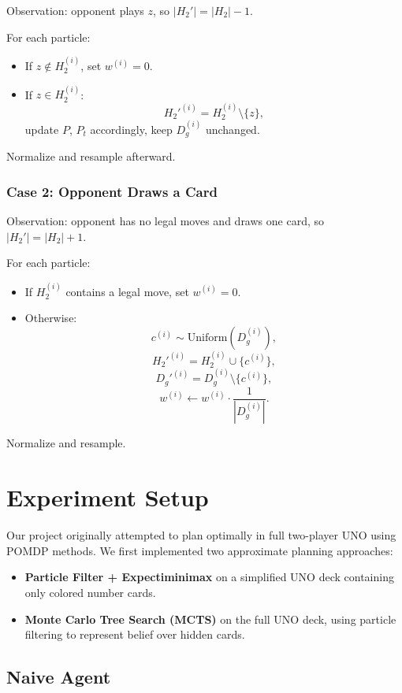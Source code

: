 \documentclass[journal,transmag]{IEEEtran}
\begin{document}
Observation: opponent plays $z$, so $|H_2'| = |H_2| - 1$.

For each particle:
\begin{itemize}
    \item If $z \notin H_2^{(i)}$, set $w^{(i)} = 0$.
    \item If $z \in H_2^{(i)}$:
    \[
    H_2'^{(i)} = H_2^{(i)} \setminus \{z\},
    \]
    update $P$, $P_t$ accordingly, keep $D_g^{(i)}$ unchanged.
\end{itemize}

Normalize and resample afterward.

\subsubsection{Case 2: Opponent Draws a Card}

Observation: opponent has no legal moves and draws one card, so  
$|H_2'| = |H_2| + 1$.

For each particle:
\begin{itemize}
    \item If $H_2^{(i)}$ contains a legal move, set $w^{(i)} = 0$.
    \item Otherwise:
    \[
    c^{(i)} \sim \text{Uniform}(D_g^{(i)}),
    \]
    \[
    H_2'^{(i)} = H_2^{(i)} \cup \{c^{(i)}\},
    \]
    \[
    D_g'^{(i)} = D_g^{(i)} \setminus \{c^{(i)}\},
    \]
    \[
    w^{(i)} \leftarrow w^{(i)} \cdot \frac{1}{|D_g^{(i)}|}.
    \]
\end{itemize}

Normalize and resample.

\section{Experiment Setup}

Our project originally attempted to plan optimally in full two-player
UNO using POMDP methods. We first implemented two approximate planning
approaches:

\begin{itemize}
    \item \textbf{Particle Filter + Expectiminimax} on a simplified UNO
          deck containing only colored number cards.
    \item \textbf{Monte Carlo Tree Search (MCTS)} on the full UNO deck,
          using particle filtering to represent belief over hidden cards.
\end{itemize}

\subsection{Naive Agent}
\end{document}
